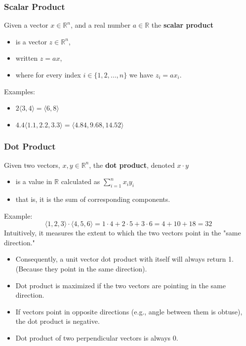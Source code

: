 \documentclass[10pt]{article}
\begin{document}
\subsubsection*{Scalar Product}
Given a vector $x \in \mathbb{R}^n$, and a real number $a \in \mathbb{R}$ the \textbf{scalar product}
\begin{itemize}
	\item is a vector $z \in \mathbb{R}^n$,
	\item written $z = ax$,
	\item where for every index $i \in \{1, 2, \dots, n\}$ we have $z_i = ax_i$.
\end{itemize}
Examples:
\begin{itemize}
	\item $2 \langle 3, 4 \rangle = \langle 6, 8 \rangle$
	\item $4.4 \langle 1.1, 2.2, 3.3 \rangle = \langle 4.84, 9.68, 14.52 \rangle$
\end{itemize}

\subsubsection*{Dot Product}
Given two vectors, $x, y \in \mathbb{R}^n$, the \textbf{dot product}, denoted $x \cdot y$ 
\begin{itemize}
	\item is a value in $\mathbb{R}$ calculated as $\sum_{i = 1}^n x_i y_i$
	\item that is, it is the sum of corresponding components.
\end{itemize}
Example:
\[\langle 1, 2, 3 \rangle \cdot \langle 4, 5, 6 \rangle = 1 \cdot 4 + 2 \cdot 5 + 3 \cdot 6 = 4 + 10 + 18 = 32\]
Intuitively, it measures the extent to which the two vectors point in the "same direction."
\begin{itemize}
	\item Consequently, a unit vector dot product with itself will always return 1.  (Because they point in the same direction).
	\item Dot product is maximized if the two vectors are pointing in the same direction.
	\item If vectors point in opposite directions (e.g., angle between them is obtuse), the dot product is negative.
	\item Dot product of two perpendicular vectors is always 0.
\end{itemize}
\end{document}
